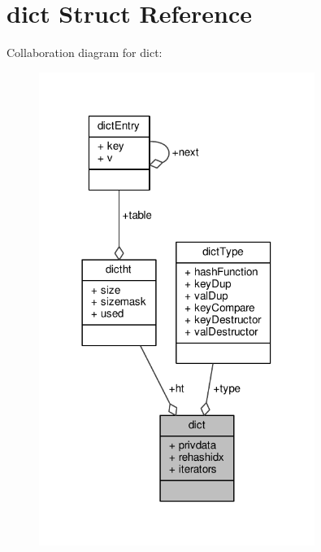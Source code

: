 \hypertarget{structdict}{}\section{dict Struct Reference}
\label{structdict}


Collaboration diagram for dict\+:\nopagebreak
\begin{figure}[H]
\begin{center}
\leavevmode
\includegraphics[width=254pt]{structdict__coll__graph}
\end{center}
\end{figure}
